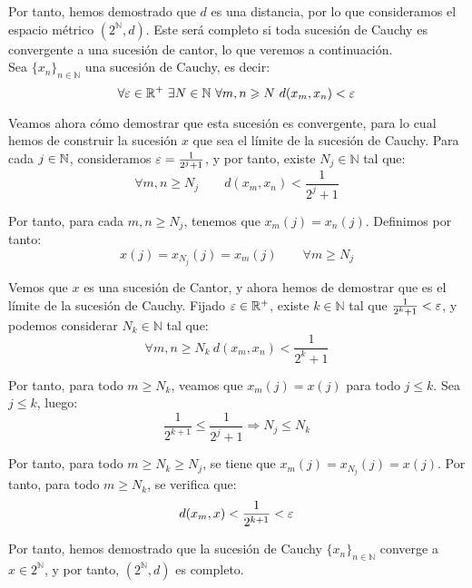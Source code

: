 \begin{ejercicio}
    Por tanto, hemos demostrado que $d$ es una distancia, por lo que consideramos el espacio métrico $(2^\mathbb{N},d)$. Este será completo si toda sucesión de Cauchy es convergente a una sucesión de cantor, lo que veremos a continuación.\\

    Sea $\{x_n\}_{n\in \mathbb{N}}$ una sucesión de Cauchy, es decir:
    \begin{equation*}
        \forall \veps\in \mathbb{R}^+\ \exists N\in \mathbb{N}\ \forall m,n\geq N\ d(x_m,x_n) < \veps
    \end{equation*}

    Veamos ahora cómo demostrar que esta sucesión es convergente, para lo cual hemos de construir la sucesión $x$ que sea el límite de la sucesión de Cauchy. Para cada $j\in \mathbb{N}$, consideramos $\varepsilon=\frac{1}{2^j+1}$, y por tanto, existe $N_j\in \mathbb{N}$ tal que:
    \begin{equation*}
        \forall m,n\geq N_j\qquad d(x_m,x_n) < \frac{1}{2^j+1}
    \end{equation*}

    Por tanto, para cada $m,n\geq N_j$, tenemos que $x_m(j)=x_n(j)$. Definimos por tanto:
    \begin{equation*}
        x(j) = x_{N_j}(j) = x_m(j) \qquad \forall m\geq N_j
    \end{equation*}

    Vemos que $x$ es una sucesión de Cantor, y ahora hemos de demostrar que es el límite de la sucesión de Cauchy. Fijado $\varepsilon\in \mathbb{R}^+$, existe $k\in \mathbb{N}$ tal que $\frac{1}{2^k+1} < \varepsilon$, y podemos considerar $N_k\in \mathbb{N}$ tal que:
    \begin{equation*}
        \forall m,n\geq N_k\ d(x_m,x_n) < \frac{1}{2^k+1}
    \end{equation*}

    Por tanto, para todo $m\geq N_k$, veamos que $x_m(j) = x(j)$ para todo $j\leq k$. Sea $j\leq k$, luego:
    \begin{equation*}
        \frac{1}{2^{k+1}}\leq \frac{1}{2^j+1}\Longrightarrow N_j\leq N_k
    \end{equation*}

    Por tanto, para todo $m\geq N_k\geq N_j$, se tiene que $x_m(j) = x_{N_j}(j) = x(j)$. Por tanto, para todo $m\geq N_k$, se verifica que:
    \begin{equation*}
        d(x_m,x) < \frac{1}{2^{k+1}} < \varepsilon
    \end{equation*}

    Por tanto, hemos demostrado que la sucesión de Cauchy $\{x_n\}_{n\in \mathbb{N}}$ converge a $x\in 2^\mathbb{N}$, y por tanto, $(2^\mathbb{N},d)$ es completo.
\end{ejercicio}



